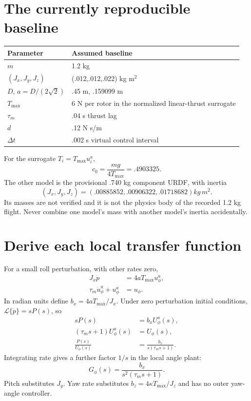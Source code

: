 \section{The currently reproducible baseline}
\begin{center}
\begin{tabular}{@{}ll@{}}\toprule
Parameter & Assumed baseline\\\midrule
$m$ & 1.2 kg\\
$(J_x,J_y,J_z)$ & (.012,.012,.022) kg m$^2$\\
$D$, $a=D/(2\sqrt2)$ & .45 m, .159099 m\\
$T_{\max}$ & 6 N per rotor in the normalized linear-thrust surrogate\\
$\tau_m$ & .04 s thrust lag\\
$d$ & .12 N s/m\\
$\Delta t$ & .002 s virtual control interval\\\bottomrule
\end{tabular}
\end{center}
For the surrogate $T_i=T_{\max}u_i^a$,
\begin{equation}
c_0=\frac{mg}{4T_{\max}}=.4903325.
\end{equation}
The other model is the provisional .740 kg component URDF, with inertia
\begin{equation}
(J_x,J_y,J_z)=(.00885852,.00906322,.01718682)\unit{kg\,m^2}.
\end{equation}
Its masses are not verified and it is
not the physics body of the recorded 1.2 kg flight. Never combine one model's
mass with another model's inertia accidentally.

\section{Derive each local transfer function}
For a small roll perturbation, with other rates zero,
\begin{align}
J_x\dot p&=4aT_{\max}u_\phi^a,\\
\tau_m\dot u_\phi^a+u_\phi^a&=u_\phi.
\end{align}
In radian units define $b_x=4aT_{\max}/J_x$. Under zero perturbation initial
conditions, $\mathcal L\{\dot p\}=sP(s)$, so
\begin{align}
sP(s)&=b_xU_\phi^a(s),\\
(\tau_ms+1)U_\phi^a(s)&=U_\phi(s),\\
\frac{P(s)}{U_\phi(s)}&=\frac{b_x}{s(\tau_ms+1)}.
\end{align}
Integrating rate gives a further factor $1/s$ in the local angle plant:
\begin{equation}
G_\phi(s)=\frac{b_x}{s^2(\tau_ms+1)}.
\end{equation}
Pitch substitutes $J_y$. Yaw rate substitutes $b_z=4\kappa T_{\max}/J_z$ and
has no outer yaw-angle controller.

